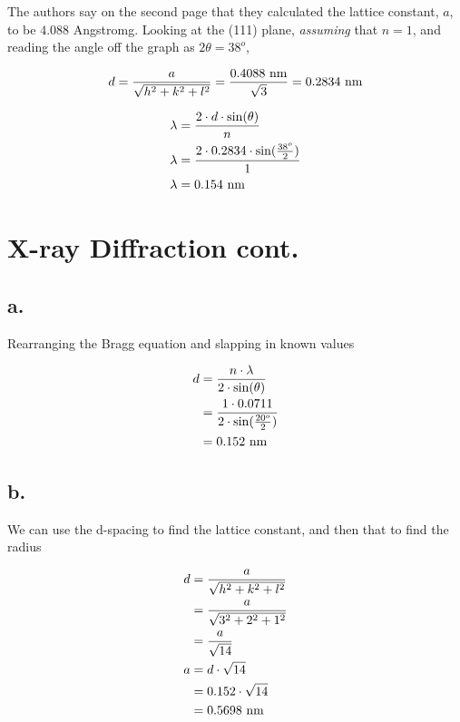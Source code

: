 \documentclass{article}
\begin{document}
The authors say on the second page that they calculated the lattice constant, $a$, to be $4.088$ Angstromg. Looking at the (111) plane, \textit{assuming} that $n=1$, and reading the angle off the graph as $2 \theta = 38^o$,

\[
    d = \frac{a}{\sqrt{h^2 + k^2 + l^2}} = \frac{0.4088 \ \textnormal{nm}}{\sqrt{3}} = 0.2834 \ \textnormal{nm}
\]

\begin{align*}
    \lambda &= \frac{2 \cdot d \cdot \sin (\theta)}{n} \\
    \lambda &= \frac{2 \cdot 0.2834 \cdot \sin(\frac{38^o}{2})}{1} \\
    \lambda &= 0.154 \ \textnormal{nm}
\end{align*}

\section{X-ray Diffraction cont.}

\subsection*{a.}

Rearranging the Bragg equation and slapping in known values

\begin{align*}
    d &= \frac{n \cdot \lambda}{2\cdot\sin(\theta)} \\
    &= \frac{1 \cdot 0.0711}{2 \cdot \sin(\frac{20^o}{2})} \\
    &= 0.152 \ \textnormal{nm}
\end{align*}

\subsection*{b.}

We can use the d-spacing to find the lattice constant, and then that to find the radius

\begin{align*}
    d &= \frac{a}{\sqrt{h^2 + k^2 + l^2}} \\
    &= \frac{a}{\sqrt{3^2 + 2^2 + 1^2}} \\
    &= \frac{a}{\sqrt{14}} \\
    a &= d \cdot \sqrt{14} \\
    &= 0.152 \cdot \sqrt{14} \\
    &= 0.5698 \ \textnormal{nm}
\end{align*}
\end{document}
